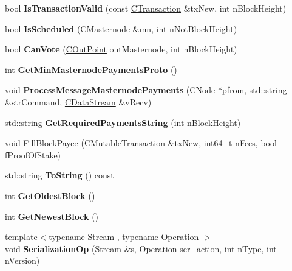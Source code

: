 \begin{DoxyCompactItemize}
\mbox{\label{class_c_masternode_payments_aa1376c50210f892f65ad7ee6408c02f9}} 
bool {\bfseries Is\+Transaction\+Valid} (const \mbox{\hyperlink{class_c_transaction}{C\+Transaction}} \&tx\+New, int n\+Block\+Height)
\item 
\mbox{\label{class_c_masternode_payments_ae7b481b02b86b14946497bb21e375f1a}} 
bool {\bfseries Is\+Scheduled} (\mbox{\hyperlink{class_c_masternode}{C\+Masternode}} \&mn, int n\+Not\+Block\+Height)
\item 
\mbox{\label{class_c_masternode_payments_ad0891106128d392e1cb4206061b4aec4}} 
bool {\bfseries Can\+Vote} (\mbox{\hyperlink{class_c_out_point}{C\+Out\+Point}} out\+Masternode, int n\+Block\+Height)
\item 
\mbox{\label{class_c_masternode_payments_adb98cc9f21cf8746c0b6ac3131b85dfb}} 
int {\bfseries Get\+Min\+Masternode\+Payments\+Proto} ()
\item 
\mbox{\label{class_c_masternode_payments_a8884bca6edff64f731b3c42ea4693251}} 
void {\bfseries Process\+Message\+Masternode\+Payments} (\mbox{\hyperlink{class_c_node}{C\+Node}} $\ast$pfrom, std\+::string \&str\+Command, \mbox{\hyperlink{class_c_data_stream}{C\+Data\+Stream}} \&v\+Recv)
\item 
\mbox{\label{class_c_masternode_payments_a5527c8d625c8e32ea27cf645453365cc}} 
std\+::string {\bfseries Get\+Required\+Payments\+String} (int n\+Block\+Height)
\item 
void \mbox{\hyperlink{class_c_masternode_payments_a459bf2e3a7e56743663026fd8f6d768d}{Fill\+Block\+Payee}} (\mbox{\hyperlink{struct_c_mutable_transaction}{C\+Mutable\+Transaction}} \&tx\+New, int64\+\_\+t n\+Fees, bool f\+Proof\+Of\+Stake)
\item 
\mbox{\label{class_c_masternode_payments_ac020d2b42771a003a271d4ddb014272a}} 
std\+::string {\bfseries To\+String} () const
\item 
\mbox{\label{class_c_masternode_payments_a61e838b723c876d944a56dc51c8995ce}} 
int {\bfseries Get\+Oldest\+Block} ()
\item 
\mbox{\label{class_c_masternode_payments_ad61c535b18ebd9e669fa607ab5b3033a}} 
int {\bfseries Get\+Newest\+Block} ()
\item 
\mbox{\label{class_c_masternode_payments_a94644b08b8e3d359794457a0871f95cc}} 
{\footnotesize template$<$typename Stream , typename Operation $>$ }\\void {\bfseries Serialization\+Op} (Stream \&s, Operation ser\+\_\+action, int n\+Type, int n\+Version)
\end{DoxyCompactItemize}
